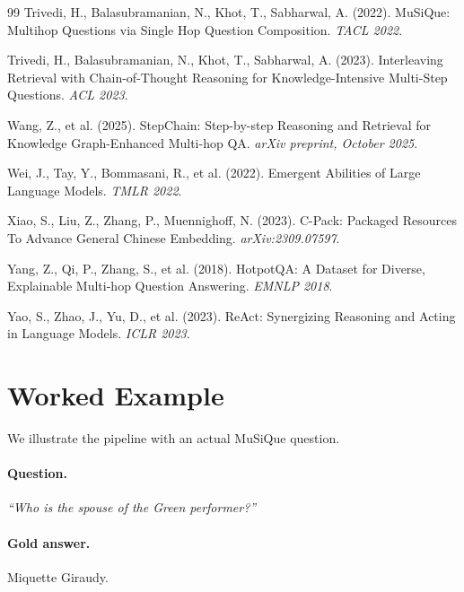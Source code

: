 \documentclass[11pt]{article}
\begin{document}
\begin{thebibliography}{99}
Trivedi, H., Balasubramanian, N., Khot, T., Sabharwal, A. (2022).
MuSiQue: Multihop Questions via Single Hop Question Composition.
\emph{TACL 2022}.

Trivedi, H., Balasubramanian, N., Khot, T., Sabharwal, A. (2023).
Interleaving Retrieval with Chain-of-Thought Reasoning for Knowledge-Intensive Multi-Step Questions.
\emph{ACL 2023}.

Wang, Z., et al. (2025).
StepChain: Step-by-step Reasoning and Retrieval for Knowledge Graph-Enhanced Multi-hop QA.
\emph{arXiv preprint, October 2025}.

Wei, J., Tay, Y., Bommasani, R., et al. (2022).
Emergent Abilities of Large Language Models.
\emph{TMLR 2022}.

Xiao, S., Liu, Z., Zhang, P., Muennighoff, N. (2023).
C-Pack: Packaged Resources To Advance General Chinese Embedding.
\emph{arXiv:2309.07597}.

Yang, Z., Qi, P., Zhang, S., et al. (2018).
HotpotQA: A Dataset for Diverse, Explainable Multi-hop Question Answering.
\emph{EMNLP 2018}.

Yao, S., Zhao, J., Yu, D., et al. (2023).
ReAct: Synergizing Reasoning and Acting in Language Models.
\emph{ICLR 2023}.

\end{thebibliography}

\appendix

\section{Worked Example}
\label{app:example}

We illustrate the pipeline with an actual MuSiQue question.

\paragraph{Question.} \emph{``Who is the spouse of the Green performer?''}

\paragraph{Gold answer.} Miquette Giraudy.
\end{document}

